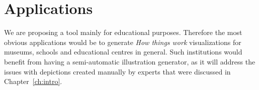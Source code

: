 \chapter{Applications}

We are proposing a tool mainly for educational purposes.
Therefore the most obvious applications would be to generate \textit{How things work} visualizations for museums, schools and educational centres in general.
Such institutions would benefit from having a semi-automatic illustration generator, as it will address the issues with depictions created manually by experts that were discussed in Chapter~\ref{ch:intro}.

